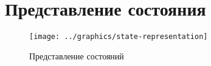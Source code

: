 


\section{Представление состояния}
\label{sec:state-represent}

\begin{figure}[ht]
  \centering
  \texttt{[image: ../graphics/state-representation]}  
  \caption{Представление состояний}
  \label{fig:state-repr}
\end{figure}

